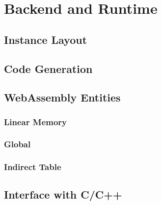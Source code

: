 \chapter{Backend and Runtime}

\section{Instance Layout}

\section{Code Generation}

\section{WebAssembly Entities}

\subsection{Linear Memory}

\subsection{Global}

\subsection{Indirect Table}

\section{Interface with C/C++}
